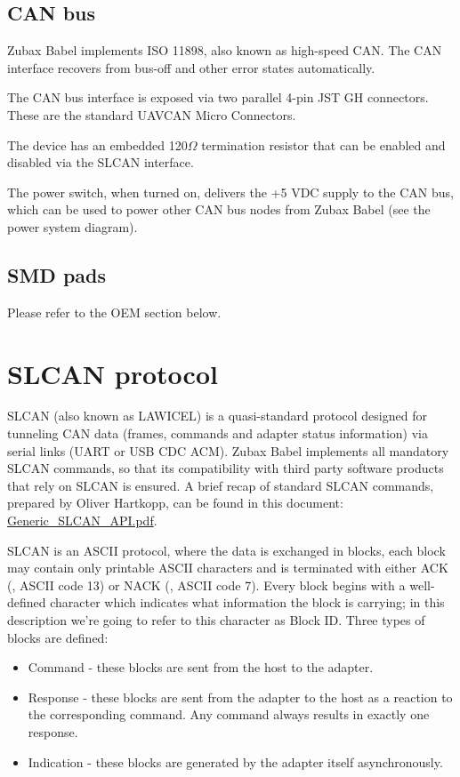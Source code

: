 \documentclass{zubaxdoc}
\begin{document}
\section{CAN bus}

Zubax Babel implements ISO 11898, also known as high-speed CAN. The CAN interface recovers from bus-off and other error states automatically.

The CAN bus interface is exposed via two parallel 4-pin JST GH connectors. These are the standard UAVCAN Micro Connectors.

The device has an embedded 120$\Omega$ termination resistor that can be enabled and disabled via the SLCAN interface.

The power switch, when turned on, delivers the +5 VDC supply to the CAN bus, which can be used to power other CAN bus nodes from Zubax Babel (see the power system diagram).

\section{SMD pads}

Please refer to the OEM section below.

\chapter{SLCAN protocol}

SLCAN (also known as LAWICEL) is a quasi-standard protocol designed for tunneling CAN data (frames, commands and adapter status information) via serial links (UART or USB CDC ACM). Zubax Babel implements all mandatory SLCAN commands, so that its compatibility with third party software products that rely on SLCAN is ensured. A brief recap of standard SLCAN commands, prepared by Oliver Hartkopp, can be found in this document: \href{https://docs.zubax.com/zubax_babel/Generic_SLCAN_API.pdf}{Generic\_SLCAN\_API.pdf}.

SLCAN is an ASCII protocol, where the data is exchanged in blocks, each block may contain only printable ASCII characters and is terminated with either ACK (, ASCII code 13) or NACK (, ASCII code 7). Every block begins with a well-defined character which indicates what information the block is carrying; in this description we’re going to refer to this character as Block ID. Three types of blocks are defined:

\begin{itemize}
\item Command - these blocks are sent from the host to the adapter.
\item Response - these blocks are sent from the adapter to the host as a reaction to the corresponding command. Any command always results in exactly one response.
\item Indication - these blocks are generated by the adapter itself asynchronously.
\end{itemize}
\end{document}
